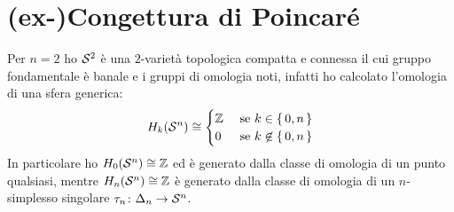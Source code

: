 

\section{(ex-)Congettura di Poincaré}

Per $ n = 2 $ ho $ \mathcal{S}^{2} $ è una $ 2 $-varietà topologica compatta e connessa
il cui gruppo fondamentale è banale e i gruppi di omologia noti, infatti ho
calcolato l'omologia di una sfera generica:
\[
  H_k(\mathcal{S}^{n}) \cong
  \begin{cases}
    \mathbb{Z} & \text{ se } k \in \set{0,n} \\
    0 & \text{ se } k \not \in \set{0,n}
  \end{cases}
\]
In particolare ho $ H_0(\mathcal{S}^{n}) \cong \mathbb{Z} $ ed è generato dalla classe di
omologia di un punto qualsiasi, mentre $ H_n(\mathcal{S}^{n}) \cong \mathbb{Z} $ è generato dalla
classe di omologia di un $ n $-simplesso singolare $ \tau_n \colon \Delta_n \to \mathcal{S}^{n} $.

